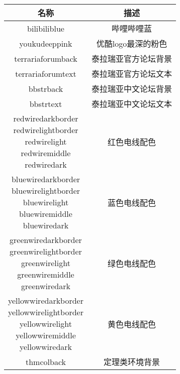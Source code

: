 \begin{longtable}{|c|c|}
	\hline
	名称 & 描述 \\\hline
	\endhead
	\textcolor{bilibiliblue}{bilibiliblue} & 哔哩哔哩蓝 \\\hline
	\textcolor{youkudeeppink}{youkudeeppink} & 优酷logo最深的粉色 \\\hline
	\textcolor{terrariaforumback}{terrariaforumback} & 泰拉瑞亚官方论坛背景 \\\hline
	\textcolor{terrariaforumtext}{terrariaforumtext} & 泰拉瑞亚官方论坛文本 \\\hline
	\textcolor{bbstrback}{bbstrback} & 泰拉瑞亚中文论坛背景 \\\hline
	\textcolor{bbstrtext}{bbstrtext} & 泰拉瑞亚中文论坛文本 \\\hline
	\makecell{
		\textcolor{redwiredarkborder}{redwiredarkborder}\\
		\textcolor{redwirelightborder}{redwirelightborder}\\
		\textcolor{redwirelight}{redwirelight}\\
		\textcolor{redwiremiddle}{redwiremiddle}\\
		\textcolor{redwiredark}{redwiredark}
	} & 红色电线配色 \\\hline
	\makecell{
		\textcolor{bluewiredarkborder}{bluewiredarkborder}\\
		\textcolor{bluewirelightborder}{bluewirelightborder}\\
		\textcolor{bluewirelight}{bluewirelight}\\
		\textcolor{bluewiremiddle}{bluewiremiddle}\\
		\textcolor{bluewiredark}{bluewiredark}
	} & 蓝色电线配色 \\\hline
	\makecell{
		\textcolor{greenwiredarkborder}{greenwiredarkborder}\\
		\textcolor{greenwirelightborder}{greenwirelightborder}\\
		\textcolor{greenwirelight}{greenwirelight}\\
		\textcolor{greenwiremiddle}{greenwiremiddle}\\
		\textcolor{greenwiredark}{greenwiredark}
	} & 绿色电线配色 \\\hline
	\makecell{
		\textcolor{yellowwiredarkborder}{yellowwiredarkborder}\\
		\textcolor{yellowwirelightborder}{yellowwirelightborder}\\
		\textcolor{yellowwirelight}{yellowwirelight}\\
		\textcolor{yellowwiremiddle}{yellowwiremiddle}\\
		\textcolor{yellowwiredark}{yellowwiredark}
	} & 黄色电线配色 \\\hline
	\textcolor{thmcolback}{thmcolback} & 定理类环境背景\\\hline
\end{longtable}